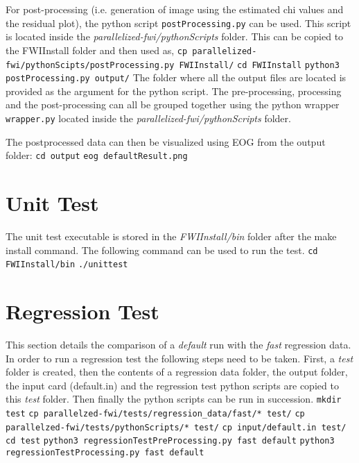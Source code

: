 \documentclass[10pt]{article}
\begin{document}
\newpage
\noindent For post-processing (i.e. generation of image using the estimated chi values and the residual plot), the python script \texttt{postProcessing.py} can be used. This script is located inside the \textit{parallelized-fwi/pythonScripts} folder. This can be copied to the FWIInstall folder and then used as,
\newline
\texttt{cp parallelized-fwi/pythonScipts/postProcessing.py FWIInstall/}
\newline
\texttt{cd FWIInstall}
\newline
\texttt{python3 postProcessing.py output/}
\newline
The folder where all the output files are located is provided as the argument for the python script. The pre-processing, processing and the post-processing can all be grouped together using the python wrapper \texttt{wrapper.py} located inside the \textit{parallelized-fwi/pythonScripts} folder.

\noindent The postprocessed data can then be visualized using EOG from the output folder:
\newline
\texttt{cd output}
\newline
\texttt{eog defaultResult.png}
\newline
 
\section{Unit Test}

The unit test executable is stored in the \textit{FWIInstall/bin} folder after the make install command. The following command can be used to run the test.
\newline
\texttt{cd FWIInstall/bin}
\newline
\texttt{./unittest}


\section{Regression Test}

This section details the comparison of a \textit{default} run with the \textit{fast} regression data. In order to run a regression test the following steps need to be taken. First, a \textit{test} folder is created, then the contents of a regression data folder, the output folder, the input card (default.in) and the regression test python scripts are copied to this \textit{test} folder. Then finally the python scripts can be run in succession.  
\newline
\texttt{mkdir test}
\newline
\texttt{cp parallelzed-fwi/tests/regression\_data/fast/* test/}
\newline
\texttt{cp parallelzed-fwi/tests/pythonScripts/* test/}
\newline
\texttt{cp input/default.in test/}
\newline
\texttt{cd test}
\newline
\texttt{python3 regressionTestPreProcessing.py fast default}
\newline
\texttt{python3 regressionTestProcessing.py fast default}
\end{document}
